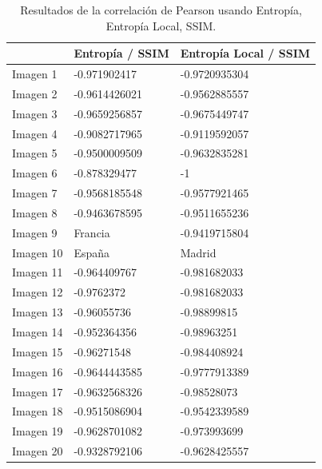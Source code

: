 \documentclass[spanish,twocolumn]{article}
\begin{document}
{\begin{minipage}[b]{1.0\linewidth}
\begin{minipage}[t]{0.3\linewidth}
  	\end{minipage}
  \vspace{0.5cm}
    \label{fig:resultado8}
\end{minipage}


\begin{table}[htbp]
\begin{center}
\begin{tabular}{|l|l|l|}
\hline
& Entropía / SSIM & Entropía Local / SSIM\\
\hline \hline
Imagen 1 & -0.971902417 & -0.9720935304 \\ \hline
Imagen 2 & -0.9614426021 & -0.9562885557 \\ \hline
Imagen 3 & -0.9659256857 & -0.9675449747 \\ \hline
Imagen 4 & -0.9082717965 & -0.9119592057 \\ \hline
Imagen 5 & -0.9500009509 & -0.9632835281 \\ \hline
Imagen 6 & -0.878329477 & -1 \\ \hline
Imagen 7 & -0.9568185548 & -0.9577921465 \\ \hline
Imagen 8 & -0.9463678595 & -0.9511655236 \\ \hline
Imagen 9 & Francia & -0.9419715804 \\ \hline
Imagen 10 & España & Madrid \\ \hline
Imagen 11 & -0.964409767 & -0.981682033 \\ \hline
Imagen 12 & -0.9762372 & -0.981682033 \\ \hline
Imagen 13 & -0.96055736 & -0.98899815 \\ \hline
Imagen 14 & -0.952364356 & -0.98963251 \\ \hline
Imagen 15 & -0.96271548 & -0.984408924 \\ \hline
Imagen 16 & -0.9644443585 & -0.9777913389 \\ \hline
Imagen 17 & -0.9632568326 & -0.98528073 \\ \hline
Imagen 18 & -0.9515086904 & -0.9542339589 \\ \hline
Imagen 19 & -0.9628701082 & -0.973993699 \\ \hline
Imagen 20 & -0.9328792106 & -0.9628425557 \\ \hline
\end{tabular}
\caption{Resultados de la correlación de Pearson usando Entropía, Entropía Local, SSIM.}
\label{tabla:correlacionSSIM}
\end{center}
\end{table}

}
\end{document}
